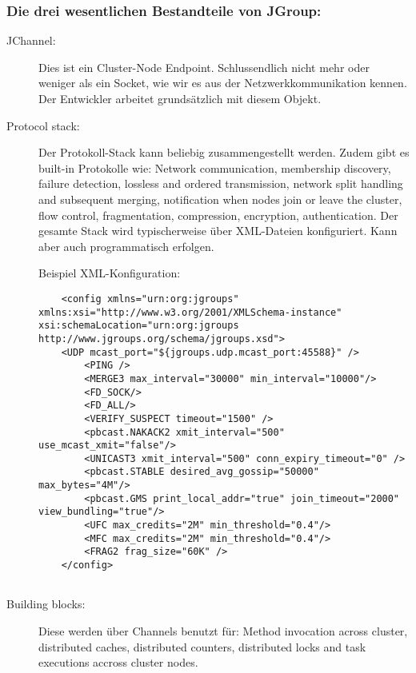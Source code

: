 \subsubsection{Die drei wesentlichen Bestandteile von JGroup:}
\begin{description}
	\item[JChannel:] Dies ist ein Cluster-Node Endpoint. Schlussendlich nicht mehr oder weniger als ein Socket, wie wir es aus der Netzwerkkommunikation kennen. Der Entwickler arbeitet grundsätzlich mit diesem Objekt.
	
	\item[Protocol stack:] Der Protokoll-Stack kann beliebig zusammengestellt werden. Zudem gibt es built-in Protokolle wie: Network communication, membership discovery, failure detection, lossless and ordered transmission, network split handling and subsequent merging, notification when nodes join or leave the cluster, flow control, fragmentation, compression, encryption, authentication. Der gesamte Stack wird typischerweise über XML-Dateien konfiguriert. Kann aber auch programmatisch erfolgen.
	
	Beispiel XML-Konfiguration:
	\begin{lstlisting}
	<config xmlns="urn:org:jgroups" xmlns:xsi="http://www.w3.org/2001/XMLSchema-instance" xsi:schemaLocation="urn:org:jgroups	http://www.jgroups.org/schema/jgroups.xsd">
	<UDP mcast_port="${jgroups.udp.mcast_port:45588}" />
		<PING />
		<MERGE3 max_interval="30000" min_interval="10000"/>
		<FD_SOCK/>
		<FD_ALL/>
		<VERIFY_SUSPECT timeout="1500" />
		<pbcast.NAKACK2 xmit_interval="500" use_mcast_xmit="false"/>
		<UNICAST3 xmit_interval="500" conn_expiry_timeout="0" />
		<pbcast.STABLE desired_avg_gossip="50000" max_bytes="4M"/>
		<pbcast.GMS print_local_addr="true" join_timeout="2000" view_bundling="true"/>
		<UFC max_credits="2M" min_threshold="0.4"/>
		<MFC max_credits="2M" min_threshold="0.4"/>
		<FRAG2 frag_size="60K" />
	</config>
	
	\end{lstlisting}
	\item[Building blocks:] Diese werden über Channels benutzt für: Method invocation across cluster, distributed caches, distributed counters, distributed locks and task executions accross cluster nodes.
\end{description}



